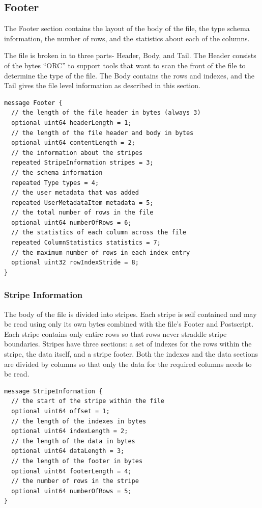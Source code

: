 \documentclass{article}
\begin{document}
\subsection{Footer}

The Footer section contains the layout of the body of the file, the
type schema information, the number of rows, and the statistics about
each of the columns.

The file is broken in to three parts- Header, Body, and Tail. The
Header consists of the bytes ``ORC'' to support tools that want to
scan the front of the file to determine the type of the file. The Body
contains the rows and indexes, and the Tail gives the file level
information as described in this section.

\begin{verbatim}
message Footer {
  // the length of the file header in bytes (always 3)
  optional uint64 headerLength = 1;
  // the length of the file header and body in bytes
  optional uint64 contentLength = 2;
  // the information about the stripes
  repeated StripeInformation stripes = 3;
  // the schema information
  repeated Type types = 4;
  // the user metadata that was added
  repeated UserMetadataItem metadata = 5;
  // the total number of rows in the file
  optional uint64 numberOfRows = 6;
  // the statistics of each column across the file
  repeated ColumnStatistics statistics = 7;
  // the maximum number of rows in each index entry
  optional uint32 rowIndexStride = 8;
}
\end{verbatim}

\subsubsection{Stripe Information}

The body of the file is divided into stripes. Each stripe is self
contained and may be read using only its own bytes combined with the
file's Footer and Postscript. Each stripe contains only entire rows so
that rows never straddle stripe boundaries. Stripes have three
sections: a set of indexes for the rows within the stripe, the data
itself, and a stripe footer. Both the indexes and the data sections
are divided by columns so that only the data for the required columns
needs to be read.

\begin{verbatim}
message StripeInformation {
  // the start of the stripe within the file
  optional uint64 offset = 1;
  // the length of the indexes in bytes
  optional uint64 indexLength = 2;
  // the length of the data in bytes
  optional uint64 dataLength = 3;
  // the length of the footer in bytes
  optional uint64 footerLength = 4;
  // the number of rows in the stripe
  optional uint64 numberOfRows = 5;
}
\end{verbatim}
\end{document}
